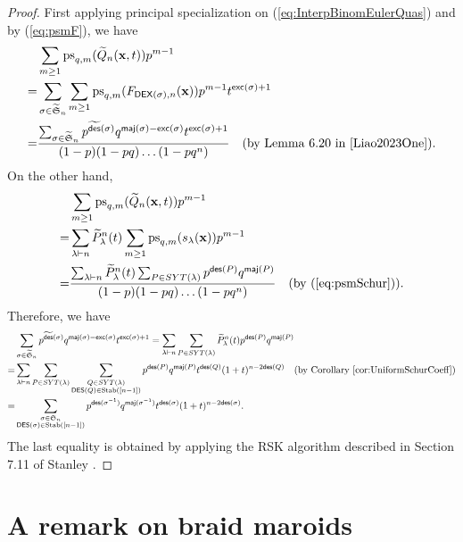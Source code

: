 \documentclass[reqno]{amsart}
\newcommand{\DES}{{\mathsf{DES}}}
\newcommand{\des}{{\mathsf{des}}}
\newcommand{\exc}{{\mathsf{exc}}}
\newcommand{\maj}{{\mathsf{maj}}}
\newcommand{\DEX}{{\mathsf{DEX}}}
\newcommand{\psm}{{\mathrm{ps}_{q,m}}}
\newcommand{\Stab}{{\mathrm{Stab}}}
\renewcommand{\S}{{\mathfrak{S}}}
\newcommand{\x}{{\mathbf{x}}}
\theoremstyle{definition}
\theoremstyle{remark}
\begin{document}
\begin{proof}
 First applying principal specialization on (\ref{eq:InterpBinomEulerQuas}) and by (\ref{eq:psmF}), we have
\begin{align*}
    &\sum_{m\ge 1}\psm(\widetilde{Q}_n(\x,t))p^{m-1}\\
    =&\sum_{\sigma\in\widetilde{\S}_n}\sum_{m\ge 1}\psm(F_{\DEX(\sigma),n}(\x))p^{m-1}t^{\exc(\sigma)+1}\\
    =&\frac{\sum_{\sigma\in\widetilde{\S}_n}p^{\widetilde{\des}(\sigma)}q^{\maj(\sigma)-\exc(\sigma)}t^{\exc(\sigma)+1}}{(1-p)(1-pq)\ldots(1-pq^n)} \quad  \text{(by Lemma 6.20 in \cite{Liao2023One})}.
\end{align*}
On the other hand, 
\begin{align*}
    &\sum_{m\ge 1}\psm(\widetilde{Q}_n(\x,t))p^{m-1}\\
    =&\sum_{\lambda\vdash n} \widetilde{P}_{\lambda}^{n}(t)\sum_{m\ge 1}\psm(s_{\lambda}(\x))p^{m-1}\\
    =&\frac{\sum_{\lambda\vdash n} \widetilde{P}_{\lambda}^{n}(t)\sum_{P\in SYT(\lambda)}p^{\des(P)}q^{\maj(P)}}{(1-p)(1-pq)\ldots(1-pq^n)} \quad \text{(by (\ref{eq:psmSchur}))}.
\end{align*}
Therefore, we have 
\begin{align*}
    &\sum_{\sigma\in\widetilde{\S}_n}p^{\widetilde{\des}(\sigma)}q^{\maj(\sigma)-\exc(\sigma)}t^{\exc(\sigma)+1}
    =\sum_{\lambda\vdash n}\sum_{P\in SYT(\lambda)} \widetilde{P}_{\lambda}^{n}(t)p^{\des(P)}q^{\maj(P)}\\
    =&\sum_{\lambda\vdash n}\sum_{P\in SYT(\lambda)}\sum_{\substack{Q\in SYT(\lambda)\\ \DES(Q)\in\Stab([n-1])}}p^{\des(P)}q^{\maj(P)} t^{\des(Q)}(1+t)^{n-2\des(Q)} \quad \text{(by Corollary \ref{cor:UniformSchurCoeff})}\\
    =& \sum_{\substack{\sigma\in\S_n\\ \DES(\sigma)\in\Stab([n-1])}}p^{\des(\sigma^{-1})}q^{\maj(\sigma^{-1})}t^{\des(\sigma)}(1+t)^{n-2\des(\sigma)}.
\end{align*}
The last equality is obtained by applying the RSK algorithm described in Section 7.11 of Stanley \cite[Lemma 7.23.1]{StanleyEC2}.
\end{proof}

\section{A remark on braid maroids} \label{sec: Braid}
\end{document}
